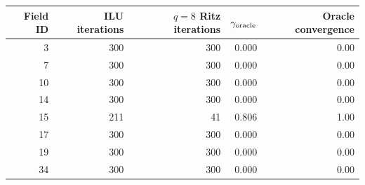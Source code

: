 \begin{tabular}{rrrrr}
\toprule
Field ID & ILU iterations & $q=8$ Ritz iterations & $\gamma_{\rm oracle}$ & Oracle convergence \\
\midrule
3  & 300 & 300 & 0.000 & 0.00 \\
7  & 300 & 300 & 0.000 & 0.00 \\
10 & 300 & 300 & 0.000 & 0.00 \\
14 & 300 & 300 & 0.000 & 0.00 \\
15 & 211 & 41  & 0.806 & 1.00 \\
17 & 300 & 300 & 0.000 & 0.00 \\
19 & 300 & 300 & 0.000 & 0.00 \\
34 & 300 & 300 & 0.000 & 0.00 \\
\bottomrule
\end{tabular}
